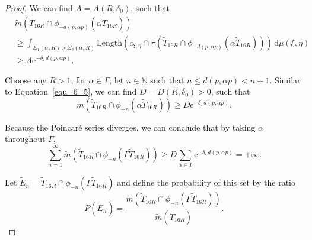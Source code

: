 \documentclass[reqno,11pt]{article}
\theoremstyle{definition}
\theoremstyle{remark}
\numberwithin{equation}{section}
\begin{document}
\begin{proof}
    We can find $A=A(R,\delta_0)$, such that
	\begin{equation}\label{equ_6_5}
		\begin{aligned}
			 & \widetilde{m}(\widetilde{T}_{16R}\cap\phi_{-d(p,\alpha p)}(\alpha\widetilde{T}_{16R}))                                                                                                                 \\
             & \geq\int_{\Sigma_1(\alpha,R)\times\Sigma_2(\alpha,R)}\text{Length}(c_{\xi,\eta}\cap\pi(\widetilde{T}_{16R}\cap\phi_{-d(p,\alpha p)}(\alpha\widetilde{T}_{16R})))\,\mathrm{d}\widetilde{\mu}(\xi,\eta) \\
			 & \geq A\mathrm{e}^{-\delta_\Gamma d(p,\alpha p)}.
		\end{aligned}
	\end{equation}

	Choose any $R>1$, for $\alpha\in\Gamma$, let $n\in\mathbb{N}$ such that $n\leq d(p,\alpha p)<n+1$. Similar to Equation~\ref{equ_6_5}, we can find $D=D(R,\delta_0)>0$, such that
	\begin{equation}\label{equ_6_6}
		\widetilde{m}(\widetilde{T}_{16R}\cap\phi_{-n}(\alpha\widetilde{T}_{16R}))\geq D\mathrm{e}^{-\delta_\Gamma d(p,\alpha p)}.
	\end{equation}

	Because the Poincar\'e series diverges, we can conclude that by taking $\alpha$ throughout $\Gamma$,
	\begin{displaymath}
		\sum_{n=1}^\infty    \widetilde{m}(\widetilde{T}_{16R}\cap\phi_{-n}(\Gamma\widetilde{T}_{16R}))\geq D\sum_{\alpha\in\Gamma}\mathrm{e}^{-\delta_\Gamma d(p,\alpha p)}=+\infty.
	\end{displaymath}

	Let $\widetilde{E}_n=\widetilde{T}_{16R}\cap\phi_{-n}(\Gamma\widetilde{T}_{16R})$ and define the probability of this set by the ratio
	\begin{displaymath}
		P(\widetilde{E}_n)=\frac{\widetilde{m}(\widetilde{T}_{16R}\cap\phi_{-n}(\Gamma\widetilde{T}_{16R}))}{\widetilde{m}(\widetilde{T}_{16R})}.
	\end{displaymath}


\end{proof}
\end{document}
